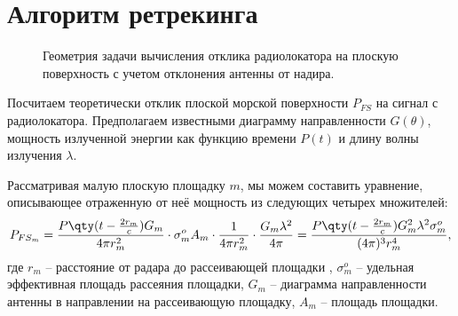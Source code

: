 \section{Алгоритм ретрекинга}
\begin{figure}[h]
    \centering
    \def\svgwidth{0.8\linewidth}
    
    \caption{Геометрия задачи вычисления отклика радиолокатора на плоскую
    поверхность с учетом отклонения антенны от надира.}
    \label{fig:geometry}
\end{figure}
Посчитаем теоретически отклик плоской морской поверхности $P_{FS}$ на сигнал с
радиолокатора.
Предполагаем известными диаграмму направленности $G(\theta)$, мощность
излученной энергии как функцию времени $P(t)$ и длину волны излучения
$\lambda$.




Рассматривая малую плоскую площадку $m$, мы можем
составить уравнение, описывающее отраженную от неё мощность из следующих
четырех множителей:
\begin{equation}
    \label{eq:Pfsm}
    P_{FS_m} = 
    \frac
        {P\qty(t - \frac{2r_m}{c}) G_m}
        {4 \pi r_m^2} 
    \cdot \sigma^o_mA_m
    \cdot \frac{1}{4 \pi r_m^2} 
    \cdot \frac{G_m \lambda^2}{4 \pi}=
    \frac
        {P\qty(t - \frac{2r_m}{c})G_m^2 \lambda^2 \sigma^o_m}
        {(4 \pi)^3 r_{m}^4},
\end{equation} 
где 
$r_m$ -- расстояние от радара до рассеивающей площадки ,
$\sigma^o_m$ -- удельная эффективная площадь рассеяния площадки,
$G_m$ -- диаграмма направленности антенны в направлении на рассеивающую
площадку,
$A_m$ -- площадь площадки.

